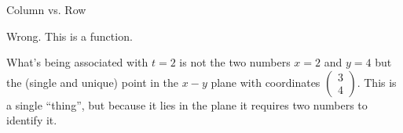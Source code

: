 \begin{mynotation}{Column vs. Row}
\begin{description}
    Wrong. This is a function.

    What's being associated with $t=2$ is not the two numbers $x=2$
    and $y=4$ but the (single and unique) point in the $x-y$ plane
    with coordinates $\begin{pmatrix}3\\4\end{pmatrix}$. This is a single ``thing'',
    but because it lies in the plane it requires two numbers to 
    identify it.
  \end{description}
\end{mynotation}









